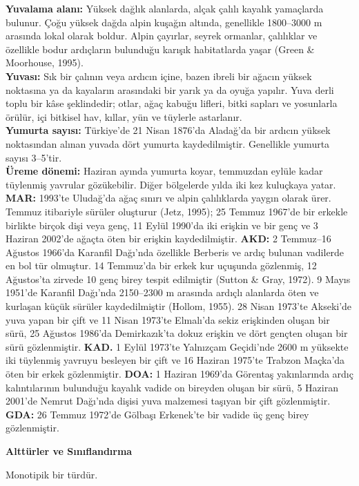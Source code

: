 \documentclass[
  10.5pt,
  a4paper,
  DIV=11,
  numbers=noendperiod,
  twocolumn]{scrreprt}
\begin{document}
\textbf{Yuvalama alanı:} Yüksek dağlık alanlarda, alçak çalılı kayalık
yamaçlarda bulunur. Çoğu yüksek dağda alpin kuşağın altında, genellikle
1800--3000 m arasında lokal olarak boldur. Alpin çayırlar, seyrek
ormanlar, çalılıklar ve özellikle bodur ardıçların bulunduğu karışık
habitatlarda yaşar (Green \& Moorhouse, 1995).\\
\textbf{Yuvası:} Sık bir çalının veya ardıcın içine, bazen ibreli bir
ağacın yüksek noktasına ya da kayaların arasındaki bir yarık ya da oyuğa
yapılır. Yuva derli toplu bir kâse şeklindedir; otlar, ağaç kabuğu
lifleri, bitki sapları ve yosunlarla örülür, içi bitkisel hav, kıllar,
yün ve tüylerle astarlanır.\\
\textbf{Yumurta sayısı:} Türkiye'de 21 Nisan 1876'da Aladağ'da bir
ardıcın yüksek noktasından alınan yuvada dört yumurta kaydedilmiştir.
Genellikle yumurta sayısı 3--5'tir.\\
\textbf{Üreme dönemi:} Haziran ayında yumurta koyar, temmuzdan eylüle
kadar tüylenmiş yavrular gözükebilir. Diğer bölgelerde yılda iki kez
kuluçkaya yatar. \textbf{MAR:} 1993'te Uludağ'da ağaç sınırı ve alpin
çalılıklarda yaygın olarak ürer. Temmuz itibariyle sürüler oluşturur
(Jetz, 1995); 25 Temmuz 1967'de bir erkekle birlikte birçok dişi veya
genç, 11 Eylül 1990'da iki erişkin ve bir genç ve 3 Haziran 2002'de
ağaçta öten bir erişkin kaydedilmiştir. \textbf{AKD:} 2 Temmuz--16
Ağustos 1966'da Karanfil Dağı'nda özellikle Berberis ve ardıç bulunan
vadilerde en bol tür olmuştur. 14 Temmuz'da bir erkek kur uçuşunda
gözlenmiş, 12 Ağustos'ta zirvede 10 genç birey tespit edilmiştir (Sutton
\& Gray, 1972). 9 Mayıs 1951'de Karanfil Dağı'nda 2150--2300 m arasında
ardıçlı alanlarda öten ve kurlaşan küçük sürüler kaydedilmiştir (Hollom,
1955). 28 Nisan 1973'te Akseki'de yuva yapan bir çift ve 11 Nisan
1973'te Elmalı'da sekiz erişkinden oluşan bir sürü, 25 Ağustos 1986'da
Demirkazık'ta dokuz erişkin ve dört gençten oluşan bir sürü
gözlenmiştir. \textbf{KAD.} 1 Eylül 1973'te Yalnızçam Geçidi'nde 2600 m
yüksekte iki tüylenmiş yavruyu besleyen bir çift ve 16 Haziran 1975'te
Trabzon Maçka'da öten bir erkek gözlenmiştir. \textbf{DOA:} 1 Haziran
1969'da Görentaş yakınlarında ardıç kalıntılarının bulunduğu kayalık
vadide on bireyden oluşan bir sürü, 5 Haziran 2001'de Nemrut Dağı'nda
dişisi yuva malzemesi taşıyan bir çift gözlenmiştir. \textbf{GDA:} 26
Temmuz 1972'de Gölbaşı Erkenek'te bir vadide üç genç birey gözlenmiştir.

\textbf{Alttürler ve Sınıflandırma}

Monotipik bir türdür.
\end{document}

